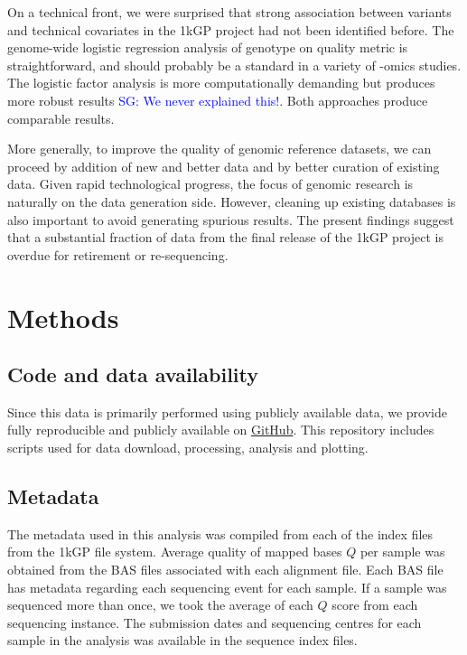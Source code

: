 \documentclass[9pt,lineno]{template}
\newcommand{\sgcomment}[1]{\textcolor{blue}{SG: #1}}
\begin{document}
On a technical front, we were surprised that strong association between variants and technical covariates in the 1kGP project had not been identified before. 
The genome-wide logistic regression analysis of genotype on quality metric is straightforward, and should probably be a standard in a variety of -omics studies. The logistic factor analysis is more computationally demanding but produces more robust results \sgcomment{We never explained this!}. Both approaches produce comparable results.  

More generally, to improve the quality of genomic reference datasets, we can proceed by addition of new and better data and by better curation of existing data.
Given rapid technological progress, the focus of genomic research is naturally on the data generation side. 
However, cleaning up existing databases is also important to avoid generating spurious results. 
The present findings suggest that a substantial fraction of data from the final release of the 1kGP project is overdue for retirement or re-sequencing.


\section{Methods}
\subsection{Code and data availability}
Since this data is primarily performed using publicly available data, we provide fully reproducible and publicly available on \href{https://github.com/LukeAndersonTrocme/LegacyData}{GitHub}.
This repository includes scripts used for data download, processing, analysis and plotting.

\subsection{Metadata}
The metadata used in this analysis was compiled from each of the index files from the 1kGP file system. 
Average quality of mapped bases $Q$ per sample was obtained from the BAS files associated with each alignment file.
Each BAS file has metadata regarding each sequencing event for each sample. 
If a sample was sequenced more than once, we took the average of each $Q$ score from each sequencing instance. 
The submission dates and sequencing centres for each sample in the analysis was available in the sequence index files.
\end{document}
